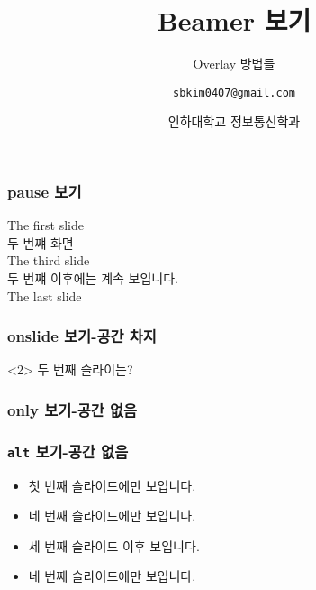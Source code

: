 \documentclass{beamer}
\title{Beamer 보기}
\subtitle{Overlay 방법들}
\author[Cheng-Bin Jin]{\texttt{sbkim0407@gmail.com}}
\date[\today]{인하대학교 정보통신학과}
\institute{컴퓨터비젼 연구실}
\begin{document}
\begin{frame}
\titlepage
\end{frame}

\begin{frame}
\frametitle{pause 보기}
The first slide \\
\pause
두 번쨰 화면 \\
\pause
The third slide \\
\pause[2]
두 번쨰 이후에는 계속 보입니다. \\
\pause
The last slide \\
\end{frame}

\begin{frame}
\frametitle{onslide 보기-공간 차지}
\end{frame}

\newcommand{\blueonly}{\only{\color{blue}}}
\begin{frame}
\blueonly<2> 두 번째 슬라이는?
\end{frame}

\begin{frame}
\frametitle{only 보기-공간 없음}
\end{frame}

\begin{frame}
\frametitle{\texttt{alt} 보기-공간 없음}
\begin{itemize}
\item<1>{첫 번째 슬라이드에만 보입니다. \newline}
\item<2> 
{네 번째 슬라이드에만 보입니다. \newline}
\item<3->{세 번째 슬라이드 이후 보입니다. \newline}
\item<4>{네 번째 슬라이드에만 보입니다.}
\end{itemize}
\end{frame}
\end{document}
